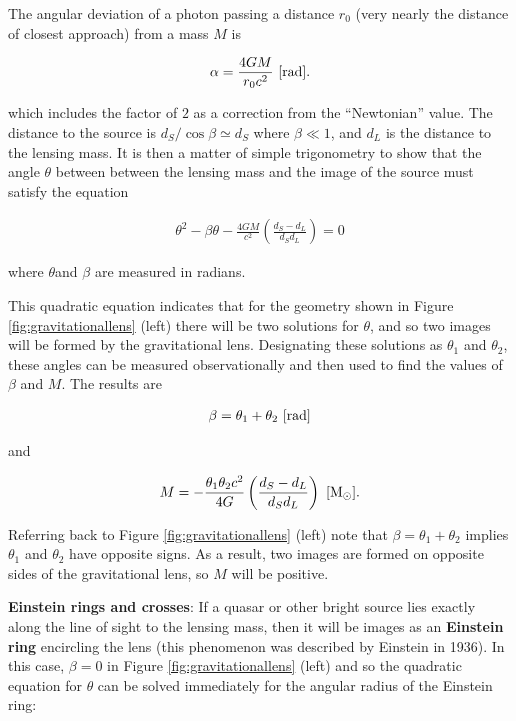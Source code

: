 \documentclass[a4paper,10pt]{article}
\begin{document}
{\noindent}The angular deviation of a photon passing a distance $r_0$ (very nearly the distance of closest approach) from a mass $M$ is

\begin{align*}
    \alpha = \frac{4GM}{r_0c^2} ~ [{\rm rad}].
\end{align*}

{\noindent}which includes the factor of $2$ as a correction from the ``Newtonian'' value. The distance to the source is $d_S/\cos\beta\simeq d_S$ where $\beta\ll1$, and $d_L$ is the distance to the lensing mass. It is then a matter of simple trigonometry to show that the angle $\theta$ between between the lensing mass and the image of the source must satisfy the equation

\begin{align*}
    \theta^2 - \beta\theta - \frac{4GM}{c^2} \left(\frac{d_S-d_L}{d_Sd_L}\right) = 0
\end{align*}

{\noindent}where $\theta$and $\beta$ are measured in radians.

{\noindent}This quadratic equation indicates that for the geometry shown in Figure \ref{fig:gravitationallens} (left) there will be two solutions for $\theta$, and so two images will be formed by the gravitational lens. Designating these solutions as $\theta_1$ and $\theta_2$, these angles can be measured observationally and then used to find the values of $\beta$ and $M$. The results are

\begin{align*}
    \beta = \theta_1 + \theta_2 ~ [{\rm rad}]
\end{align*}

{\noindent}and

\begin{align*}
    M = -\frac{\theta_1\theta_2c^2}{4G} \left(\frac{d_S-d_L}{d_Sd_L}\right) ~ [{\rm M_\odot}].
\end{align*}

{\noindent}Referring back to Figure \ref{fig:gravitationallens} (left) note that $\beta=\theta_1+\theta_2$ implies $\theta_1$ and $\theta_2$ have opposite signs. As a result, two images are formed on opposite sides of the gravitational lens, so $M$ will be positive.

{\noindent}\textbf{Einstein rings and crosses}: If a quasar or other bright source lies exactly along the line of sight to the lensing mass, then it will be images as an \textbf{Einstein ring} encircling the lens (this phenomenon was described by Einstein in 1936). In this case, $\beta=0$ in Figure \ref{fig:gravitationallens} (left) and so the quadratic equation for $\theta$ can be solved immediately for the angular radius of the Einstein ring:
\end{document}

